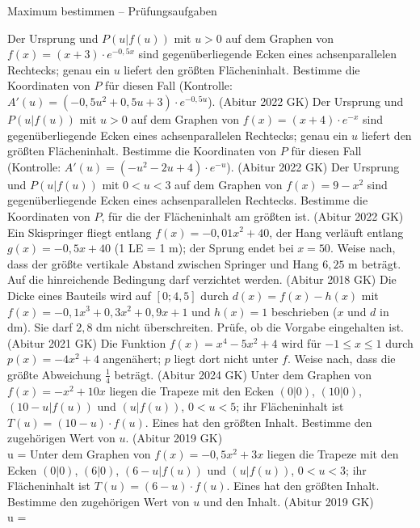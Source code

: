 \begin{aufgabe}{Maximum bestimmen – Prüfungsaufgaben}
\begin{teile}
\teil Der Ursprung und $P(u | f(u))$ mit $u > 0$ auf dem Graphen von $f(x) = (x + 3) \cdot e^{-0{,}5x}$ sind gegenüberliegende Ecken eines achsenparallelen Rechtecks; genau ein $u$ liefert den größten Flächeninhalt. Bestimme die Koordinaten von $P$ für diesen Fall (Kontrolle: $A'(u) = (-0{,}5u^2 + 0{,}5u + 3) \cdot e^{-0{,}5u}$). \hfill (Abitur 2022 GK)
\teil Der Ursprung und $P(u | f(u))$ mit $u > 0$ auf dem Graphen von $f(x) = (x + 4) \cdot e^{-x}$ sind gegenüberliegende Ecken eines achsenparallelen Rechtecks; genau ein $u$ liefert den größten Flächeninhalt. Bestimme die Koordinaten von $P$ für diesen Fall (Kontrolle: $A'(u) = (-u^2 - 2u + 4) \cdot e^{-u}$). \hfill (Abitur 2022 GK)
\teil Der Ursprung und $P(u | f(u))$ mit $0 < u < 3$ auf dem Graphen von $f(x) = 9 - x^2$ sind gegenüberliegende Ecken eines achsenparallelen Rechtecks. Bestimme die Koordinaten von $P$, für die der Flächeninhalt am größten ist. \hfill (Abitur 2022 GK)
\teil Ein Skispringer fliegt entlang $f(x) = -0{,}01x^2 + 40$, der Hang verläuft entlang $g(x) = -0{,}5x + 40$ (1 LE = 1 m); der Sprung endet bei $x = 50$. Weise nach, dass der größte vertikale Abstand zwischen Springer und Hang $6{,}25$ m beträgt. Auf die hinreichende Bedingung darf verzichtet werden. \hfill (Abitur 2018 GK)
\teil Die Dicke eines Bauteils wird auf $[0; 4{,}5]$ durch $d(x) = f(x) - h(x)$ mit $f(x) = -0{,}1x^3 + 0{,}3x^2 + 0{,}9x + 1$ und $h(x) = 1$ beschrieben ($x$ und $d$ in dm). Sie darf $2{,}8$ dm nicht überschreiten. Prüfe, ob die Vorgabe eingehalten ist. \hfill (Abitur 2021 GK)
\teil Die Funktion $f(x) = x^4 - 5x^2 + 4$ wird für $-1 \le x \le 1$ durch $p(x) = -4x^2 + 4$ angenähert; $p$ liegt dort nicht unter $f$. Weise nach, dass die größte Abweichung $\tfrac{1}{4}$ beträgt. \hfill (Abitur 2024 GK)
\teil Unter dem Graphen von $f(x) = -x^2 + 10x$ liegen die Trapeze mit den Ecken $(0 | 0)$, $(10 | 0)$, $(10 - u | f(u))$ und $(u | f(u))$, $0 < u < 5$; ihr Flächeninhalt ist $T(u) = (10 - u) \cdot f(u)$. Eines hat den größten Inhalt. Bestimme den zugehörigen Wert von $u$. \hfill (Abitur 2019 GK) \\ u = \leerfeld
\teil Unter dem Graphen von $f(x) = -0{,}5x^2 + 3x$ liegen die Trapeze mit den Ecken $(0 | 0)$, $(6 | 0)$, $(6 - u | f(u))$ und $(u | f(u))$, $0 < u < 3$; ihr Flächeninhalt ist $T(u) = (6 - u) \cdot f(u)$. Eines hat den größten Inhalt. Bestimme den zugehörigen Wert von $u$ und den Inhalt. \hfill (Abitur 2019 GK) \\ u = \leerfeld

\end{teile}
\end{aufgabe}
